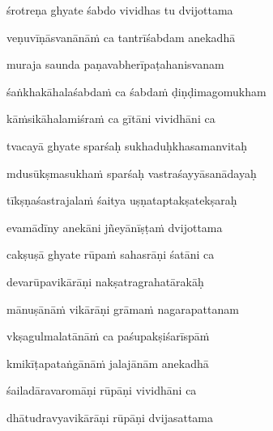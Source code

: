 śrotreṇa ghyate śabdo vividhas tu dvijottama\thinspace{\dandab} \dontdisplaylinenum

veṇuvīṇāsvanānāṁ ca tantrīśabdam anekadhā \veg\dontdisplaylinenum

muraja saunda paṇavabherīpaṭahanisvanam\thinspace{\dandab} \dontdisplaylinenum

śaṅkhakāhalaśabdaṁ ca śabdaṁ ḍiṇḍimagomukham \veg\dontdisplaylinenum
{}

kāṁsikāhalamiśraṁ ca gītāni vividhāni ca\thinspace{\dandab} \dontdisplaylinenum



tvacayā ghyate sparśaḥ sukhaduḥkhasamanvitaḥ \veg\dontdisplaylinenum
{}

mdusūkṣmasukhaṁ sparśaḥ vastraśayyāsanādayaḥ\thinspace{\dandab} \dontdisplaylinenum

tīkṣṇaśastrajalaṁ śaitya uṣṇataptakṣatekṣaraḥ \veg\dontdisplaylinenum
{}

evamādīny anekāni jñeyānīṣṭaṁ dvijottama\thinspace{\dandab} \dontdisplaylinenum



cakṣuṣā ghyate rūpaṁ sahasrāṇi śatāni ca \veg\dontdisplaylinenum

devarūpavikārāṇi nakṣatragrahatārakāḥ\thinspace{\dandab} \dontdisplaylinenum

mānuṣānāṁ vikārāṇi grāmaṁ nagarapattanam \veg\dontdisplaylinenum

vkṣagulmalatānāṁ ca paśupakṣiśarīspāṁ\thinspace{\dandab} \dontdisplaylinenum

kmikīṭapataṅgānāṁ jalajānām anekadhā \veg\dontdisplaylinenum

śailadāravaromāṇi rūpāṇi vividhāni ca\thinspace{\dandab} \dontdisplaylinenum

dhātudravyavikārāṇi rūpāṇi dvijasattama \veg\dontdisplaylinenum



